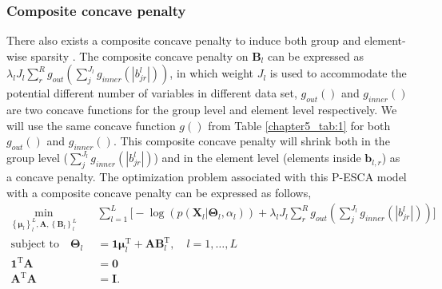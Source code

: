 \subsubsection{Composite concave penalty}
There also exists a composite concave penalty to induce both group and element-wise sparsity \cite{huang2012selective}. The composite concave penalty on $\mathbf{B}_l$ can be expressed as $\lambda_l J_l \sum_{r}^{R} g_{out}(\sum_{j}^{J_l} g_{inner}(|b_{jr}^l|))$, in which weight $J_l$ is used to accommodate the potential different number of variables in different data set, $g_{out}()$ and $g_{inner}()$ are two concave functions for the group level and element level respectively. We will use the same concave function $g()$ from Table \ref{chapter5_tab:1} for both $g_{out}()$ and $g_{inner}()$. This composite concave penalty will shrink both in the group level ($\sum_{j}^{J_l} g_{inner}(|b_{jr}^l|)$) and in the element level (elements inside $\mathbf{b}_{l,r}$) as a concave penalty. The optimization problem associated with this P-ESCA model with a composite concave penalty can be expressed as follows,
\begin{equation}\label{chapter6_eq:3}
\begin{aligned}
    \min_{ \left\{\bm{\mu}_l\right\}_{l}^{L}, \mathbf{A}, \left\{\mathbf{B}_l\right\}_{l}^{L}} \quad & \sum_{l=1}^{L} \Big[ -\log(p(\mathbf{X}_l|\mathbf{\Theta}_l, \alpha_l)) + \lambda_l J_l \sum_{r}^{R} g_{out}(\sum_{j}^{J_l} g_{inner}(|b_{jr}^l|)) \Big] \\
    \text{subject to} \quad \mathbf{\Theta}_l &= \mathbf{1}\bm{\mu}_l^{\text{T}} + \mathbf{AB}_l^{\text{T}}, \quad l = 1,\ldots,L \\
     \mathbf{1}^{\text{T}}\mathbf{A} &= \mathbf{0}\\
	 \mathbf{A}^{\text{T}}\mathbf{A} &= \mathbf{I}. \\
\end{aligned}
\end{equation}

